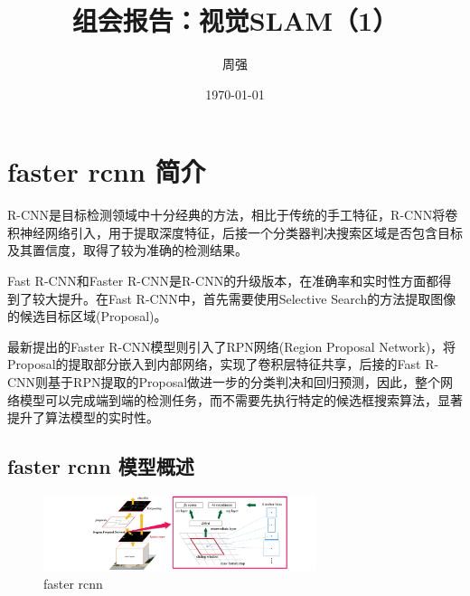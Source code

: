 \documentclass[UTF8]{ctexart}
\title{组会报告：视觉SLAM（1）}
\author{周强}
\date{\today}
\begin{document}
\maketitle %

\section{faster rcnn 简介}
R-CNN是目标检测领域中十分经典的方法，相比于传统的手工特征，R-CNN将卷积神经网络引入，用于提取深度特征，后接一个分类器判决搜索区域是否包含目标及其置信度，取得了较为准确的检测结果。

Fast R-CNN和Faster R-CNN是R-CNN的升级版本，在准确率和实时性方面都得到了较大提升。在Fast R-CNN中，首先需要使用Selective Search的方法提取图像的候选目标区域(Proposal)。

最新提出的Faster R-CNN模型则引入了RPN网络(Region Proposal Network)，将Proposal的提取部分嵌入到内部网络，实现了卷积层特征共享，后接的Fast R-CNN则基于RPN提取的Proposal做进一步的分类判决和回归预测，因此，整个网络模型可以完成端到端的检测任务，而不需要先执行特定的候选框搜索算法，显著提升了算法模型的实时性。


\subsection{faster rcnn 模型概述}
\begin{figure}[!h]
	\centerline{\includegraphics[width=8cm]{images/faster_rcnn_network.png}}
	\caption{faster rcnn}
	\label{fig:faster_rcnn}
\end{figure}
\end{document}
